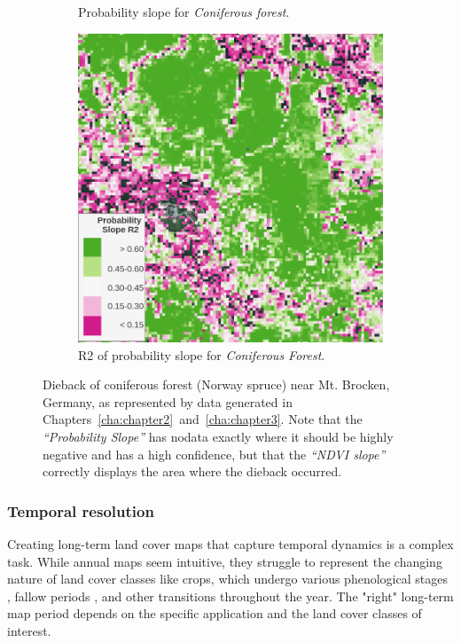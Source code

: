 \begin{figure}[H]
\begin{subfigure}[t]{0.24\textwidth}
        \caption{Probability slope for \textit{Coniferous forest}.}
        \label{fig:brocken_pslope}
        \end{subfigure}
        \hfill
        \begin{subfigure}[t]{0.24\textwidth}
        \centering
        \includegraphics[width=\linewidth,height=\linewidth]{figs_06/brocken_pslope_r2_withlegend.png}
        \caption{R2 of probability slope for \textit{Coniferous Forest}.}
        \label{fig:brocken_pslope_r2}
        \end{subfigure}
        \caption{Dieback of coniferous forest (Norway spruce) near Mt. Brocken, Germany, as represented by data generated in Chapters\@~\ref{cha:chapter2}\@~and\@~\ref{cha:chapter3}. Note that the \textit{``Probability Slope''} has nodata exactly where it should be highly negative and has a high confidence, but that the \textit{``NDVI slope''} correctly displays the area where the dieback occurred.}
        \label{fig:brocken_slope_analysis}
        \end{figure}

        \subsubsection{Temporal resolution}

        Creating long-term land cover maps that capture temporal dynamics is a complex task. While annual maps seem intuitive, they struggle to represent the changing nature of land cover classes like crops, which undergo various phenological stages \citep{russwurm2023end}, fallow periods \citep{tong2020forgotten}, and other transitions \citep{rodriguez2024classification} throughout the year. The "right" long-term map period depends on the specific application and the land cover classes of interest. 
        

